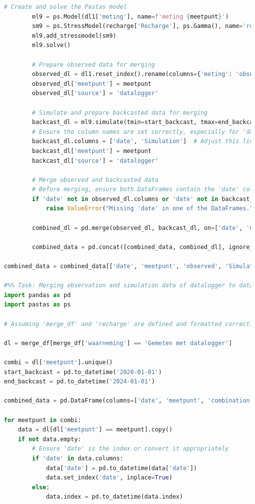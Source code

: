 \begin{lstlisting}[language=Python]
        # Create and solve the Pastas model
        ml9 = ps.Model(dl1['meting'], name=f'meting {meetpunt}')
        sm9 = ps.StressModel(recharge['Recharge'], ps.Gamma(), name='recharge', settings='evap')
        ml9.add_stressmodel(sm9)
        ml9.solve()
        
        # Prepare observed data for merging
        observed_dl = dl1.reset_index().rename(columns={'meting': 'observed'})
        observed_dl['meetpunt'] = meetpunt
        observed_dl['source'] = 'datalogger'
        
        # Simulate and prepare backcasted data for merging
        backcast_dl = ml9.simulate(tmin=start_backcast, tmax=end_backcast).reset_index()
        # Ensure the column names are set correctly, especially for 'date' and the simulation results
        backcast_dl.columns = ['date', 'Simulation']  # Adjust this line according to the actual structure
        backcast_dl['meetpunt'] = meetpunt
        backcast_dl['source'] = 'datalogger'
        
        # Merge observed and backcasted data
        # Before merging, ensure both DataFrames contain the 'date' column
        if 'date' not in observed_dl.columns or 'date' not in backcast_dl.columns:
            raise ValueError("Missing 'date' in one of the DataFrames.")

        combined_dl = pd.merge(observed_dl, backcast_dl, on=['date', 'meetpunt', 'source'], how='outer')
        
        combined_data = pd.concat([combined_data, combined_dl], ignore_index=True)

combined_data = combined_data[['date', 'meetpunt', 'observed', 'Simulation', 'source']]

#%% Task: Merging observation and simulation data of datalogger to dataframe.
import pandas as pd
import pastas as ps

# Assuming 'merge_df' and 'recharge' are defined and formatted correctly

dl = merge_df[merge_df['waarneming'] == 'Gemeten met datalogger']

combi = dl['meetpunt'].unique()
start_backcast = pd.to_datetime('2020-01-01')
end_backcast = pd.to_datetime('2024-01-01')

combined_data = pd.DataFrame(columns=['date', 'meetpunt', 'combination', 'source'])

for meetpunt in combi:
    data = dl[dl['meetpunt'] == meetpunt].copy()
    if not data.empty:
        # Ensure 'date' is the index or convert it appropriately
        if 'date' in data.columns:
            data['date'] = pd.to_datetime(data['date'])
            data.set_index('date', inplace=True)
        else:
            data.index = pd.to_datetime(data.index)
        

\end{lstlisting}
